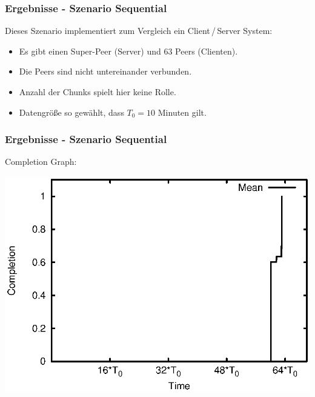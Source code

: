
\begin{frame}
  \frametitle{Ergebnisse - Szenario Sequential}
  Dieses Szenario implementiert zum Vergleich ein Client\,/\,Server System:

  \begin{itemize}  
    \item Es gibt einen Super-Peer (Server) und 63 Peers (Clienten).
    \item Die Peers sind nicht untereinander verbunden.
    \item Anzahl der Chunks spielt hier keine Rolle.    
    \item Datengröße so gewählt, dass $T_0=10$ Minuten gilt.
  \end{itemize}
\end{frame}

\begin{frame}
  \frametitle{Ergebnisse - Szenario Sequential}
  Completion Graph:
  
  \begin{center}
    \includegraphics[width=1\textwidth]{fig/plots/scenario_2_seq/plots/GeneratedMeanChunkCompletion.csv.eps}
  \end{center}
\end{frame}

